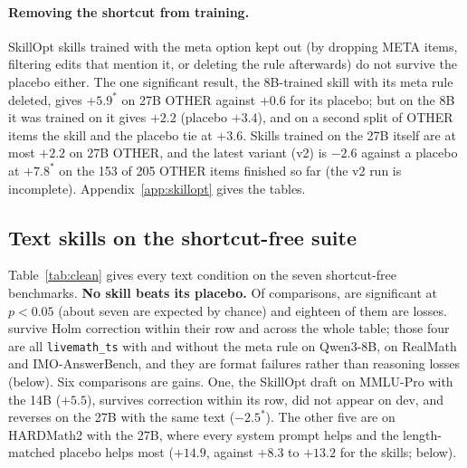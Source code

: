 \documentclass[11pt]{article}
\begin{document}
\paragraph{Removing the shortcut from training.} SkillOpt skills trained with the meta option kept
out (by dropping META items, filtering edits that mention it, or deleting the rule afterwards) do
not survive the placebo either. The one significant result, the 8B-trained skill with its meta rule
deleted, gives $+5.9^{*}$ on 27B OTHER against $+0.6$ for its placebo; but on the 8B it was trained
on it gives $+2.2$ (placebo $+3.4$), and on a second split of OTHER items the skill and the placebo
tie at $+3.6$. Skills trained on the 27B itself are at most $+2.2$ on 27B OTHER, and the latest
variant (v2) is $-2.6$ against a placebo at $+7.8^{*}$ on the 153 of 205 OTHER items finished so far (the v2 run is incomplete). Appendix~\ref{app:skillopt} gives the tables.

\subsection{Text skills on the shortcut-free suite}
\label{sec:clean}

Table~\ref{tab:clean} gives every text condition on the seven shortcut-free benchmarks.
\textbf{No skill beats its placebo.} Of \nTextTests{} comparisons, \nTextSig{} are significant
at $p<0.05$ (about seven are expected by chance) and eighteen of them are losses. \nTextHolmRow{}
survive Holm correction within their row and \nTextHolmAll{} across the whole table; those four are
all \texttt{livemath\_ts} with and without the meta rule on Qwen3-8B, on RealMath and IMO-AnswerBench,
and they are format failures rather than reasoning losses (below). Six comparisons are gains. One,
the SkillOpt draft on MMLU-Pro with the 14B ($+5.5$), survives correction within its row, did not
appear on dev, and reverses on the 27B with the same text ($-2.5^{*}$). The other five are on
HARDMath2 with the 27B, where every system prompt helps and the length-matched placebo helps most
($+14.9$, against $+8.3$ to $+13.2$ for the skills; below).
\end{document}
